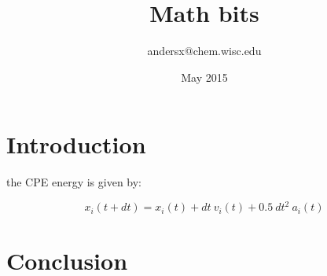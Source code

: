 \documentclass{article}
\title{Math bits}
\author{andersx@chem.wisc.edu}
\date{May 2015}
\begin{document}
\maketitle

\section{Introduction}

the CPE energy is given by:\cite{cpekaminski}

\begin{equation}
     x_i(t+dt)   = x_i(t) + dt\ v_i(t) + 0.5\ dt^2\ a_i(t)
\end{equation}

\section{Conclusion}



\end{document}
